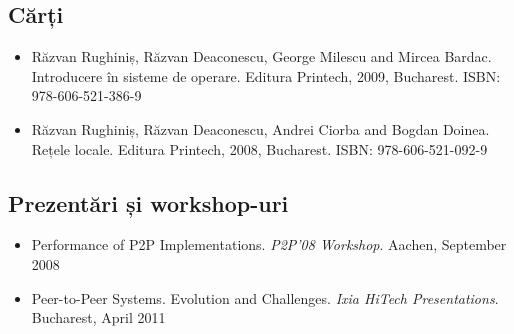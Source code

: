 \subsection{Cărți}

\begin{itemize}
  \item Răzvan Rughiniș, Răzvan Deaconescu, George Milescu and Mircea Bardac.
  Introducere în sisteme de operare. Editura Printech, 2009, Bucharest. ISBN:
  978-606-521-386-9
  \item Răzvan Rughiniș, Răzvan Deaconescu, Andrei Ciorba and Bogdan Doinea.
  Rețele locale. Editura Printech, 2008, Bucharest. ISBN: 978-606-521-092-9
\end{itemize}

\subsection{Prezentări și workshop-uri}

\begin{itemize}
  \item Performance of P2P Implementations. \textit{P2P'08 Workshop}. Aachen,
  September 2008
  \item Peer-to-Peer Systems. Evolution and Challenges. \textit{Ixia HiTech
  Presentations}. Bucharest, April 2011
\end{itemize}
